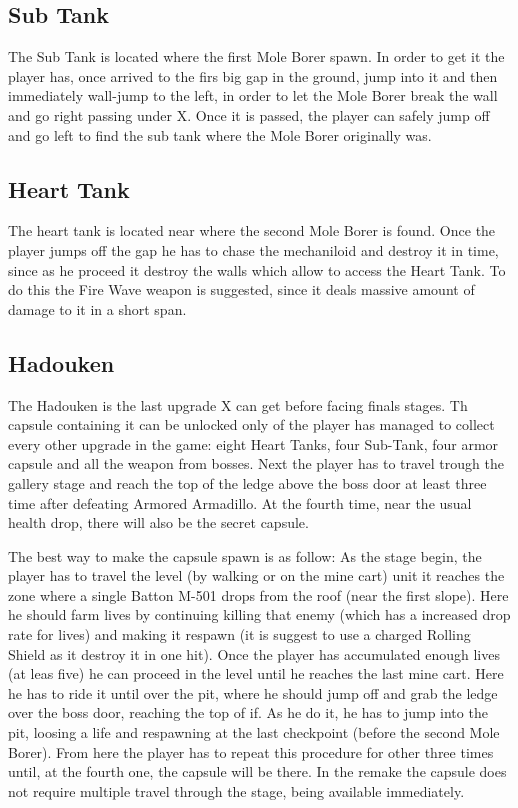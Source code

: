 \subsection{Sub Tank}
The Sub Tank is located where the first Mole Borer spawn. In order to get it the player has, once arrived to the firs big gap in the ground, jump into it and then immediately wall-jump to the left, in order to let the Mole Borer break the wall and go right passing under X. Once it is passed, the player can safely jump off and go left to find the sub tank where the Mole Borer originally was. 

\subsection{Heart Tank}
The heart tank is located near where the second Mole Borer is found. Once the player jumps off the gap he has to chase the mechaniloid and destroy it in time, since as he proceed it destroy the walls which allow to access the Heart Tank. To do this the Fire Wave weapon is suggested, since it deals massive amount of damage to it in a short span. 

\subsection{Hadouken}\label{Hadouken}
The Hadouken is the last upgrade X can get before facing finals stages. Th capsule containing it can be unlocked only of the player has managed to collect every other upgrade in the game: eight Heart Tanks, four Sub-Tank, four armor capsule and all the weapon from bosses. Next the player has to travel trough the gallery stage and reach the top of the ledge above the boss door at least three time after defeating Armored Armadillo. At the fourth time, near the usual health drop, there will also be the secret capsule.  %

The best way to make the capsule spawn is as follow: As the stage begin, the player has to travel the level (by walking or on the mine cart) unit it reaches the zone where a single Batton M-501 drops from the roof (near the first slope). Here he should farm lives by continuing killing that enemy (which has a increased drop rate for lives)  and making it respawn (it is suggest to use a charged Rolling Shield as it destroy it in one hit). Once the player has accumulated enough lives (at leas five) he can proceed in the level until he reaches the last mine cart. Here he has to ride it until over the pit, where he should jump off and grab the ledge over the boss door, reaching the top of if. As he do it, he has to jump into the pit, loosing a life and respawning at the last checkpoint (before the second Mole Borer). From here the player has to repeat this procedure for other three times until, at the  fourth one, the capsule will be there. In the remake the capsule does not require multiple travel through the stage, being available immediately.

